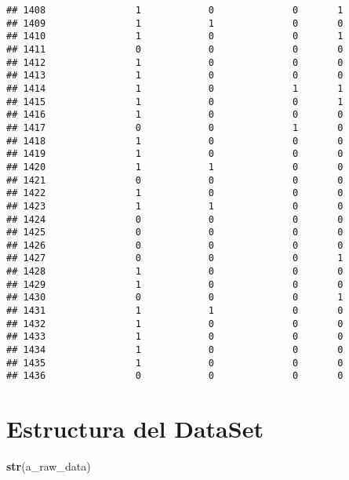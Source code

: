 \documentclass[]{article}
\newenvironment{Shaded}{\begin{snugshade}}{\end{snugshade}}
\newcommand{\KeywordTok}[1]{\textcolor[rgb]{0.13,0.29,0.53}{\textbf{#1}}}
\newcommand{\NormalTok}[1]{#1}
\begin{document}
\begin{verbatim}
## 1408                1            0              0       1
## 1409                1            1              0       0
## 1410                1            0              0       1
## 1411                0            0              0       0
## 1412                1            0              0       0
## 1413                1            0              0       0
## 1414                1            0              1       1
## 1415                1            0              0       1
## 1416                1            0              0       0
## 1417                0            0              1       0
## 1418                1            0              0       0
## 1419                1            0              0       0
## 1420                1            1              0       0
## 1421                0            0              0       0
## 1422                1            0              0       0
## 1423                1            1              0       0
## 1424                0            0              0       0
## 1425                0            0              0       0
## 1426                0            0              0       0
## 1427                0            0              0       1
## 1428                1            0              0       0
## 1429                1            0              0       0
## 1430                0            0              0       1
## 1431                1            1              0       0
## 1432                1            0              0       0
## 1433                1            0              0       0
## 1434                1            0              0       0
## 1435                1            0              0       0
## 1436                0            0              0       0
\end{verbatim}

\hypertarget{estructura-del-dataset}{%
\section{Estructura del DataSet}\label{estructura-del-dataset}}

\begin{Shaded}
\begin{Highlighting}[]
\KeywordTok{str}\NormalTok{(a_raw_data)}
\end{Highlighting}
\end{Shaded}
\end{document}
